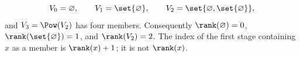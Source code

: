 \begin{example}
\[
  V_0=\varnothing,\qquad
  V_1=\set{\varnothing},\qquad
  V_2=\set{\varnothing,\set{\varnothing}},
\]
and \(V_3=\Pow(V_2)\) has four members.  Consequently
\(\rank(\varnothing)=0\), \(\rank(\set{\varnothing})=1\), and
\(\rank(V_2)=2\).  The index of the first stage containing \(x\) as a member
is \(\rank(x)+1\); it is not \(\rank(x)\).
\end{example}

